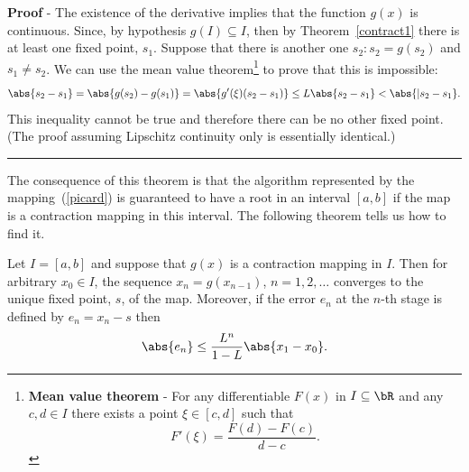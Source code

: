 \noindent
\textbf{Proof} - The existence of the derivative implies that the
function $g(x)$ is continuous.  Since, by hypothesis $g(I) \subseteq
I$, then by Theorem~\ref{contract1} there is at least one fixed point,
$s_1$.  Suppose that there is another one $s_2 : s_2 = g(s_2)$ and
$s_1 \ne s_2$.  We can use the mean value
theorem\footnote{\textbf{Mean value theorem} - For any differentiable
$F(x)$ in $I \subseteq \bR$ and any $c, d \in I$ there exists a point
$\xi \in [c,d]$ such that
%
\begin{equation*}
  F'(\xi) = \frac{F(d)-F(c)}{d-c} .
\end{equation*}
}
to prove that this is impossible:
%
\begin{equation*}
  \abs{s_2 - s_1} = \abs{g(s_2) - g(s_1)} =
  \abs{g'(\xi) (s_2 - s_1)}  \le L \abs{s_2 - s_1} < \abs{|s_2 - s_1} .
\end{equation*}
%
This inequality cannot be true and therefore there can be no other
fixed point. (The proof assuming Lipschitz continuity only is
essentially identical.) \hfill \rule{3mm}{3mm}

\smallskip

The consequence of this theorem is that the algorithm represented by
the mapping~(\ref{picard}) is guaranteed to have a root in an interval
$[a,b]$ if the map is a contraction mapping in this interval.  The
following theorem tells us how to find it.

\smallskip

\begin{theorem}
\label{contract4}
Let $I=[a,b]$ and suppose that $g(x)$ is a contraction mapping in $I$.
Then for arbitrary $x_0 \in I$, the sequence $x_n = g(x_{n-1})$,
$n=1,2,\ldots$ converges to the unique fixed point, $s$, of the map.
Moreover, if the error $e_n$ at the $n$-th stage is defined by $e_n =
x_n - s$ then
%
\begin{equation*}
  \abs{e_n} \le \frac{L^n}{1-L} \abs{ x_1 - x_0 } .
\end{equation*}
\end{theorem}

